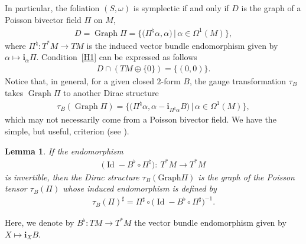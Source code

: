 \documentclass[pdftex]{sigma}
\numberwithin{equation}{section}
\newtheorem{Lemma}[Theorem]{Lemma}
\begin{document}
In particular, the foliation $(S,\omega)$ is symplectic if and only if $D$ is the graph of a Poisson bivector f\/ield $\Pi$ on $M$,
\begin{gather}
D=\operatorname*{Graph}\Pi=\big\{\big(\Pi^{\natural}\alpha,\alpha\big)\,|\,\alpha\in\Omega^{1}(M)\big\}, \label{H1}
\end{gather}
where $\Pi^{\natural}\colon T^{\ast}M\rightarrow TM$ is the induced vector bundle endomorphism given by $\alpha\mapsto\mathbf{i}_{\alpha}\Pi$. Condition~\eqref{H1} can be expressed as follows
\begin{gather*}
D\cap  ( TM\oplus\{0\} ) =\{(0,0)\}.
\end{gather*}
Notice that, in general, for a given closed $2$-form $B$, the gauge transformation $\tau_{B}$ takes $\operatorname*{Graph}\Pi$ to another Dirac structure
\begin{gather*}
\tau_{B}(\operatorname*{Graph}\Pi)=\big\{\big(\Pi^{\natural}\alpha,\alpha-\mathbf{i}_{\Pi^{\natural}\alpha}B\big)\,|\,\alpha\in\Omega^{1}(M)\big\},
\end{gather*}
which may not necessarily come from a Poisson bivector f\/ield. We have the simple, but useful, criterion (see \cite[pp.~5--6]{SeWe-01}).

\begin{Lemma}\label{lem21}
If the endomorphism
\begin{gather*}
\big( \operatorname{Id}-B^{\flat}\circ\Pi^{\natural}\big) \colon \ T^{\ast }M\rightarrow T^{\ast}M
\end{gather*}
is invertible, then the Dirac structure $\tau_{B}(\mathrm{Graph}\Pi)$ is the graph of the Poisson tensor $\tau_{B}(\Pi)$ whose induced endomorphism is
defined by
\begin{gather*}
\tau_{B}(\Pi)^{\sharp}=\Pi^{\sharp}\circ\big(\operatorname{Id}-B^{\flat}\circ \Pi^{\sharp}\big)^{-1}.
\end{gather*}
\end{Lemma}

 Here, we denote by $B^{\flat}\colon TM\to T^*M$ the vector bundle endomorphism given by $X\mapsto \mathbf{i}_XB$.
\end{document}
